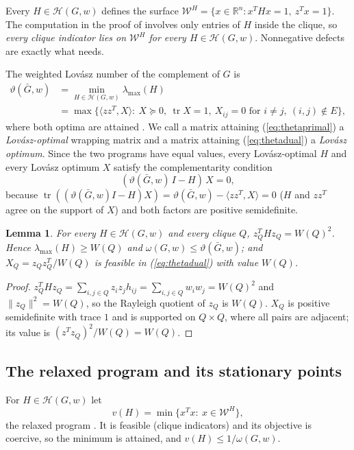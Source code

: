 \documentclass[11pt]{article}
\newtheorem{lem}[thm]{Lemma}
\theoremstyle{definition}
\theoremstyle{remark}
\newcommand{\R}{\mathbb{R}}
\newcommand{\Hc}{\mathcal{H}}
\newcommand{\Wc}{\mathcal{W}}
\newcommand{\lmax}{\lambda_{\max}}
\newcommand{\vt}{\vartheta(\bar G,w)}
\newcommand{\om}{\omega(G,w)}
\DeclareMathOperator{\tr}{tr}
\begin{document}
Every $H\in\Hc(G,w)$ defines the surface
$\Wc^H=\{x\in\R^n: x^THx=1,\ z^Tx=1\}$. The computation in the proof of
\cite[Proposition~2]{CW} involves only entries of $H$ inside the clique, so
{\em every clique indicator lies on $\Wc^H$ for every $H\in\Hc(G,w)$}.
Nonnegative defects are exactly what \cite[Proposition~1]{CW} needs.

The weighted Lov\'asz number of the complement of $G$ is
\begin{align}
\label{eq:thetaprimal}
\vt &= \min_{H\in\Hc(G,w)} \lmax(H) \\
\label{eq:thetadual}
    &= \max \{ \langle zz^T, X\rangle :\ X\succeq 0,\ \tr X = 1,\
       X_{ij}=0 \mbox{ for } i\neq j,\ (i,j)\notin E \},
\end{align}
where both optima are attained \cite{L79,GLS88,K94}. We call a matrix
attaining (\ref{eq:thetaprimal}) a {\em Lov\'asz-optimal} wrapping matrix
and a matrix attaining (\ref{eq:thetadual}) a {\em Lov\'asz optimum}.
Since the two programs have equal values, every Lov\'asz-optimal $H$ and
every Lov\'asz optimum $X$ satisfy the complementarity condition
\begin{equation}
\label{eq:compl}
(\vt\, I - H)\,X = 0,
\end{equation}
because $\tr((\vt I-H)X)=\vt-\langle zz^T,X\rangle=0$ ($H$ and $zz^T$
agree on the support of $X$) and both factors are positive semidefinite.

\begin{lem}
\label{lem:cliquevec}
For every $H\in\Hc(G,w)$ and every clique $Q$, $z_Q^THz_Q=W(Q)^2$. Hence
$\lmax(H)\geq W(Q)$ and $\om\leq\vt$; and $X_Q=z_Qz_Q^T/W(Q)$ is feasible
in (\ref{eq:thetadual}) with value $W(Q)$.
\end{lem}
\begin{proof}
$z_Q^THz_Q=\sum_{i,j\in Q} z_iz_jh_{ij}=\sum_{i,j\in Q}w_iw_j=W(Q)^2$ and
$\|z_Q\|^2=W(Q)$, so the Rayleigh quotient of $z_Q$ is $W(Q)$. $X_Q$ is
positive semidefinite with trace $1$ and is supported on $Q\times Q$, where
all pairs are adjacent; its value is $(z^Tz_Q)^2/W(Q)=W(Q)$.
\end{proof}

\subsection{The relaxed program and its stationary points}

For $H\in\Hc(G,w)$ let
\begin{equation}
\label{eq:v}
v(H) = \min \{ x^Tx :\ x\in\Wc^H \},
\end{equation}
the relaxed program \cite[(7)]{CW}. It is feasible (clique indicators) and its
objective is coercive, so the minimum is attained, and
$v(H)\leq 1/\om$.
\end{document}
